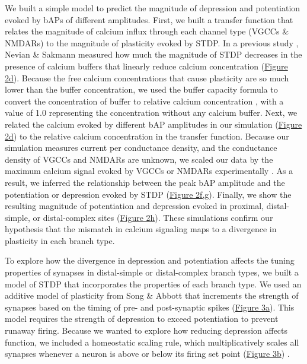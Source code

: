 We built a simple model to predict the magnitude of depression and potentiation evoked by bAPs of different amplitudes. First, we built a transfer function that relates the magnitude of calcium influx through each channel type (VGCCs \& NMDARs) to the magnitude of plasticity evoked by STDP. In a previous study \citep{nevianSpineCa2Signaling2006}, Nevian \& Sakmann measured how much the magnitude of STDP decreases in the presence of calcium buffers that linearly reduce calcium concentration (\hyperref[fig:2]{Figure 2d}). Because the free calcium concentrations that cause plasticity are so much lower than the buffer concentration, we used the buffer capacity formula to convert the concentration of buffer to relative calcium concentration \citep{sabatiniLifeCycleCa22002}, with a value of 1.0 representing the concentration without any calcium buffer. Next, we related the calcium evoked by different bAP amplitudes in our simulation (\hyperref[fig:2]{Figure 2d}) to the relative calcium concentration in the transfer function. Because our simulation measures current per conductance density, and the conductance density of VGCCs and NMDARs are unknown, we scaled our data by the maximum calcium signal evoked by VGCCs or NMDARs experimentally \citep{landauDendriticBranchStructure2022}. As a result, we inferred the relationship between the peak bAP amplitude and the potentiation or depression evoked by STDP (\hyperref[fig:2]{Figure 2f,g}). Finally, we show the resulting magnitude of potentiation and depression evoked in proximal, distal-simple, or distal-complex sites (\hyperref[fig:2]{Figure 2h}). These simulations confirm our hypothesis that the mismatch in calcium signaling maps to a divergence in plasticity in each branch type.

To explore how the divergence in depression and potentiation affects the tuning properties of synapses in distal-simple or distal-complex branch types, we built a model of STDP that incorporates the properties of each branch type. We used an additive model of plasticity from Song \& Abbott \citep{songCompetitiveHebbianLearning2000} that increments the strength of synapses based on the timing of pre- and post-synaptic spikes (\hyperref[fig:3]{Figure 3a}). This model requires the strength of depression to exceed potentiation to prevent runaway firing. Because we wanted to explore how reducing depression affects function, we included a homeostatic scaling rule, which multiplicatively scales all synapses whenever a neuron is above or below its firing set point (\hyperref[fig:3]{Figure 3b}) \citep{turrigianoHomeostaticPlasticityDeveloping2004}. 

